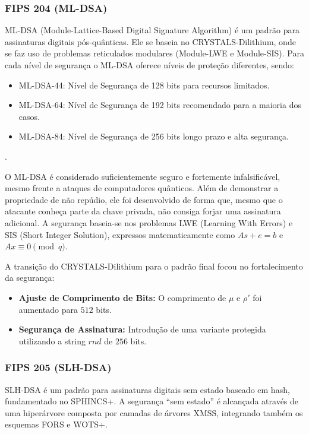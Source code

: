         \subsubsection{FIPS 204 (ML-DSA)}
            ML-DSA (Module-Lattice-Based Digital Signature Algorithm) é um padrão para assinaturas digitais pós-quânticas\cite{nistFIPS204}. Ele se baseia no CRYSTALS-Dilithium, onde se faz uso de problemas reticulados modulares (Module-LWE e Module-SIS)\cite{nistFIPS204}. Para cada nível de segurança o ML-DSA oferece níveis de proteção diferentes, sendo:\cite{nistFIPS204}
            \begin{itemize}
                \item{ML-DSA-44: Nível de Segurança de 128 bits} para recursos limitados.
                \item{ML-DSA-64: Nível de Segurança de 192 bits} recomendado para a maioria dos casos.
                \item{ML-DSA-84: Nível de Segurança de 256 bits} longo prazo e alta segurança.
            \end{itemize}\cite{nistFIPS204}.

            O ML-DSA é considerado suficientemente seguro e fortemente infalsificável, mesmo frente a ataques de computadores quânticos\cite{nistFIPS204}. Além de demonstrar a propriedade de não repúdio, ele foi desenvolvido de forma que, mesmo que o atacante conheça parte da chave privada, não consiga forjar uma assinatura adicional\cite{nistFIPS204}. A segurança baseia-se nos problemas LWE (Learning With Errors) e SIS (Short Integer Solution), expressos matematicamente como $As + e = b$ e $Ax \equiv 0 \pmod q$\cite{nistFIPS204}.

            A transição do CRYSTALS-Dilithium para o padrão final focou no fortalecimento da segurança\cite{nistFIPS204}:
            \begin{itemize}
                \item \textbf{Ajuste de Comprimento de Bits:} O comprimento de $\mu$ e $\rho'$ foi aumentado para $512$ bits.
                \item \textbf{Segurança de Assinatura:} Introdução de uma variante protegida utilizando a string $rnd$ de $256$ bits.
            \end{itemize}\cite{nistFIPS204}
    
        \subsubsection{FIPS 205 (SLH-DSA)}
            SLH-DSA é um padrão para assinaturas digitais sem estado baseado em hash, fundamentado no SPHINCS+\cite{nistFIPS205}. A segurança ``sem estado'' é alcançada através de uma hiperárvore composta por camadas de árvores XMSS, integrando também os esquemas FORS e WOTS+\cite{nistFIPS205}. 

